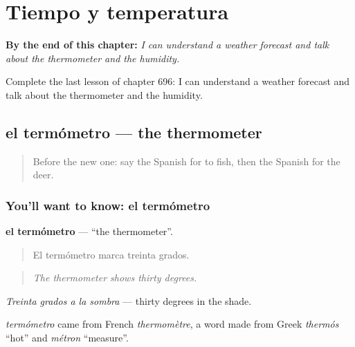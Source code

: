 
\chapter{Tiempo y temperatura}
\label{ch:es-tiempo-y-temperatura}

\begin{chapteropening}
\textbf{By the end of this chapter:} \emph{I can understand a weather forecast and talk about the thermometer and the humidity.}

Complete the last lesson of chapter 696: I can understand a weather forecast and talk about the thermometer and the humidity.
\end{chapteropening}

\section[el termómetro]{el termómetro — the thermometer}

\label{lesson:ES-C696-termometro}



\begin{quote}
Before the new one: say the Spanish for to fish, then the Spanish for the deer.
\end{quote}

\subsection*{You'll want to know: el termómetro}
\textbf{el termómetro} — \textquotedblleft{}the thermometer\textquotedblright{}.

\begin{quote}
El termómetro marca treinta grados.
\end{quote}

\begin{quote}
\emph{The thermometer shows thirty degrees.}
\end{quote}

\emph{Treinta grados a la sombra} — thirty degrees in the shade.

\begin{cousinweb}
\emph{termómetro} came from French \emph{thermomètre}, a word made from Greek \emph{thermós} \textquotedblleft{}hot\textquotedblright{} and \emph{métron} \textquotedblleft{}measure\textquotedblright{}.
\end{cousinweb}

